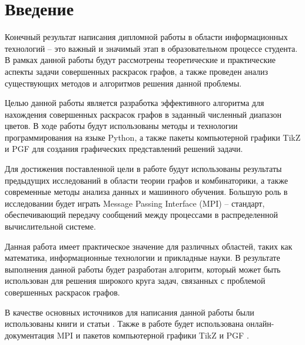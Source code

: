 \section*{Введение}

Конечный результат написания дипломной работы в области информационных технологий – это важный и значимый этап в образовательном процессе студента. В рамках данной работы будут рассмотрены теоретические и практические аспекты задачи совершенных раскрасок графов, а также проведен анализ существующих методов и алгоритмов решения данной проблемы.

Целью данной работы является разработка эффективного алгоритма для нахождения совершенных раскрасок графов в заданный численный диапазон цветов. В ходе работы будут использованы методы и технологии программирования на языке Python, а также пакеты компьютерной графики TikZ и PGF для создания графических представлений решений задачи.

Для достижения поставленной цели в работе будут использованы результаты предыдущих исследований в области теории графов и комбинаторики, а также современные методы анализа данных и машинного обучения. Большую роль в исследовании будет играть Message Passing Interface (MPI) – стандарт, обеспечивающий передачу сообщений между процессами в распределенной вычислительной системе.

Данная работа имеет практическое значение для различных областей, таких как математика, информационные технологии и прикладные науки. В результате выполнения данной работы будет разработан алгоритм, который может быть использован для решения широкого круга задач, связанных с проблемой совершенных раскрасок графов.

В качестве основных источников для написания данной работы были использованы книги \cite{tex, latex} и статьи \cite{augustinovich_11, horoshilova_9, puzynina_5}. Также в работе будет использована онлайн-документация MPI \cite{mpi} и пакетов компьютерной графики TikZ и PGF \cite{tikz}.